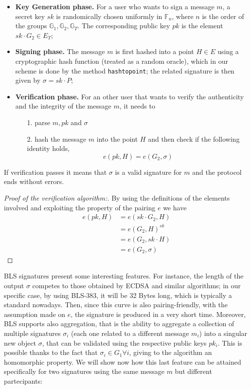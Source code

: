 \documentclass[twocolumn]{article}
\begin{document}
\begin{itemize}
    \item  \textbf{Key Generation phase.} For a user who wants to sign a message $m$, a secret key $sk$ is randomically chosen uniformly in $\mathbb{F}_n$, where $n$ is the order of the groups $\mathbb{G}_1, \mathbb{G}_2, \mathbb{G}_T$. The corresponding public key $pk$ is the element $sk\cdot G_2\in E_T$;
    \item   \textbf{Signing phase.} The message $m$ is first hashed into a point $H\in E$ using a cryptographic hash function (treated as a random oracle), which in our scheme is done by the method \verb!hashtopoint!; the related signature is then given by $\sigma = sk\cdot P$;
    \item   \textbf{Verification phase.} For an other user that wants to verify the authenticity and the integrity of the message $m$, it needs to
    \begin{itemize}
        \item [1.] parse $m, pk$ and $\sigma$
        \item [2.] hash the message $m$ into the point $H$ and then check if the following identity holds,
        \[
        e(pk,H) = e(G_2,\sigma)
        \]
    \end{itemize}
\end{itemize}
If verification passes it means that $\sigma$ is a valid signature for $m$ and the protocol ends without errors.
\begin{proof}
 [Proof of the verification algorithm:] By using the definitions of the elements involved and exploiting the property of the pairing $e$ we have
\[
\begin{split}
    e(pk,H) &= e(sk\cdot G_2, H) \\
            &= e(G_2,H)^{sk}\\
            &= e(G_2,sk\cdot H)\\
            &= e(G_2,\sigma)
\end{split}
\]
\end{proof}
BLS signatures present some interesting features. For instance, the length of the output $\sigma$ competes to those obtained by ECDSA and similar algorithms; in our specific case, by using BLS-383, it will be 32 Bytes long, which is typically a standard nowadays. Then, since this curve is also pairing-friendly, with the assumption made on $e$, the signature is produced in a very short time. Moreover, BLS supports also aggregation, that is the ability to aggregate a collection of multiple signatures $\sigma_i$ (each one related to a different message $m_i$) into a singular new object $\sigma$, that can be validated using the respective public keys $pk_i$. This is possible thanks to the fact that $\sigma_i\in G_1 \forall i$, giving to the algorithm an homomorphic property. We will show now how this last feature can be attained specifically for two signatures using the same message $m$ but different partecipants:
\end{document}
